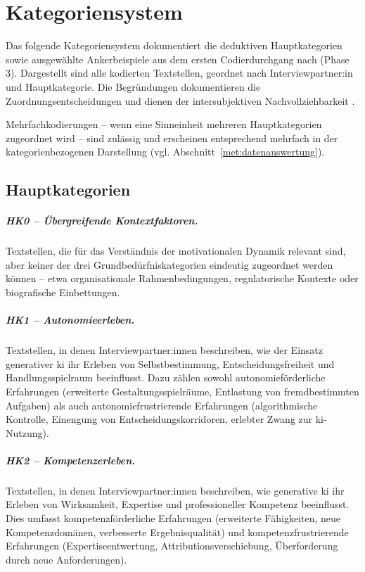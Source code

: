 \chapter{Kategoriensystem}
\label{anhang:kategoriensystem}

Das folgende Kategoriensystem dokumentiert die deduktiven Hauptkategorien sowie
ausgewählte Ankerbeispiele aus dem ersten Codierdurchgang nach
\textcite{kuckartzQualitativeInhaltsanalyseMethoden2018} (Phase 3).
Dargestellt sind alle kodierten Textstellen, geordnet nach Interviewpartner:in
und Hauptkategorie. Die Begründungen dokumentieren die Zuordnungsentscheidungen
und dienen der intersubjektiven Nachvollziehbarkeit
\parencite{kuckartzQualitativeInhaltsanalyseMethoden2018}.

Mehrfachkodierungen -- wenn eine Sinneinheit mehreren Hauptkategorien zugeordnet
wird -- sind zulässig und erscheinen entsprechend mehrfach in der
kategorienbezogenen Darstellung (vgl. Abschnitt~\ref{met:datenauswertung}).

\section*{Hauptkategorien}

\paragraph{HK0 -- Übergreifende Kontextfaktoren.}
Textstellen, die für das Verständnis der motivationalen Dynamik relevant sind,
aber keiner der drei Grundbedürfniskategorien eindeutig zugeordnet werden können
-- etwa organisationale Rahmenbedingungen, regulatorische Kontexte oder
biografische Einbettungen.

\paragraph{HK1 -- Autonomieerleben.}
Textstellen, in denen Interviewpartner:innen beschreiben, wie der Einsatz
generativer \gls{ki} ihr Erleben von Selbstbestimmung, Entscheidungsfreiheit und
Handlungsspielraum beeinflusst. Dazu zählen sowohl autonomieförderliche
Erfahrungen (erweiterte Gestaltungsspielräume, Entlastung von fremdbestimmten
Aufgaben) als auch autonomiefrustrierende Erfahrungen (algorithmische Kontrolle,
Einengung von Entscheidungskorridoren, erlebter Zwang zur \acrshort{ki}-Nutzung).

\paragraph{HK2 -- Kompetenzerleben.}
Textstellen, in denen Interviewpartner:innen beschreiben, wie generative
\gls{ki} ihr Erleben von Wirksamkeit, Expertise und professioneller Kompetenz
beeinflusst. Dies umfasst kompetenzförderliche Erfahrungen (erweiterte
Fähigkeiten, neue Kompetenzdomänen, verbesserte Ergebnisqualität) und
kompetenzfrustrierende Erfahrungen (Expertiseentwertung,
Attributionsverschiebung, Überforderung durch neue Anforderungen).


